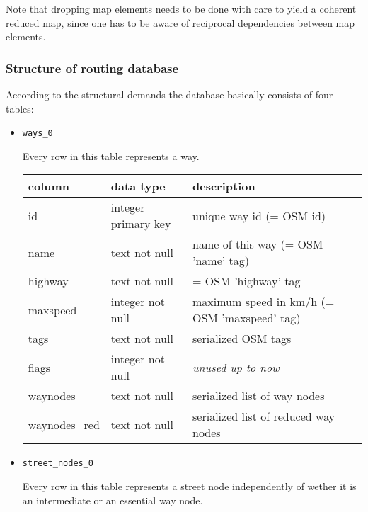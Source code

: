 Note that dropping map elements needs to be done with care to yield a coherent reduced map, since one has to be aware of reciprocal   dependencies between map elements.\newline

\subsubsection{Structure of routing database}

According to the structural demands the database basically consists of four tables:

\begin{itemize}

	\item \texttt{ways\_0}		
						
		Every row in this table represents a way.\newline

		\begin{tabular}[ht]{|p{2.5cm}|p{3.5cm}|p{8.5cm}|}
			\hline
			column & data type & description \\
			\hline\hline
			 id & integer primary key & unique way id (= OSM id)\\
			 name & text not null & name of this way (= OSM 'name' tag)\\	
			 highway & text not null & = OSM 'highway' tag\\
			 maxspeed & integer not null & maximum speed in km/h (= OSM 'maxspeed' tag)\\			 
			 tags & text not null & serialized OSM tags\\
			 flags & integer not null & \emph{unused up to now}\\				 
			 waynodes & text not null & serialized list of way nodes\\
			 waynodes\_red & text not null & serialized list of reduced way nodes\\
			\hline
		\end{tabular}\newline

	
	\item \texttt{street\_nodes\_0}

		Every row in this table represents a street node independently of wether it is an intermediate or an essential way node.\newline


\end{itemize}
